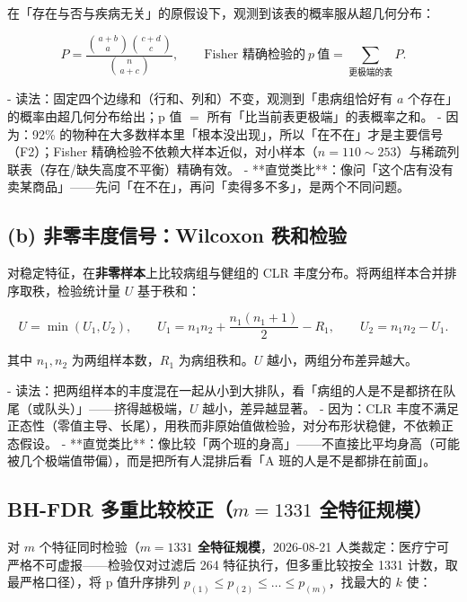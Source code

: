 \documentclass{internal-report}
\begin{document}
在「存在与否与疾病无关」的原假设下，观测到该表的概率服从超几何分布：

\begin{equation}
  P = \frac{\binom{a+b}{a}\binom{c+d}{c}}{\binom{n}{a+c}},
  \qquad
  \text{Fisher 精确检验的}\ p\ \text{值} = \sum_{\text{更极端的表}} P.
  \label{eq:fisher}
\end{equation}

- 读法：固定四个边缘和（行和、列和）不变，观测到「患病组恰好有 $a$ 个存在」的概率由超几何分布给出；p 值 $=$ 所有「比当前表更极端」的表概率之和。
- 因为：92\% 的物种在大多数样本里「根本没出现」，所以「在不在」才是主要信号（F2）；Fisher 精确检验不依赖大样本近似，对小样本（$n=110\sim253$）与稀疏列联表（存在/缺失高度不平衡）精确有效。
- **直觉类比**：像问「这个店有没有卖某商品」——先问「在不在」，再问「卖得多不多」，是两个不同问题。

\subsection{(b) 非零丰度信号：Wilcoxon 秩和检验}
\label{sec:wilcoxon}

对稳定特征，在\textbf{非零样本}上比较病组与健组的 CLR 丰度分布。将两组样本合并排序取秩，检验统计量 $U$ 基于秩和：

\begin{equation}
  U = \min(U_1, U_2),
  \qquad
  U_1 = n_1 n_2 + \frac{n_1(n_1+1)}{2} - R_1,
  \qquad
  U_2 = n_1 n_2 - U_1.
  \label{eq:wilcoxon}
\end{equation}

其中 $n_1,n_2$ 为两组样本数，$R_1$ 为病组秩和。$U$ 越小，两组分布差异越大。

- 读法：把两组样本的丰度混在一起从小到大排队，看「病组的人是不是都挤在队尾（或队头）」——挤得越极端，$U$ 越小，差异越显著。
- 因为：CLR 丰度不满足正态性（零值主导、长尾），用秩而非原始值做检验，对分布形状稳健，不依赖正态假设。
- **直觉类比**：像比较「两个班的身高」——不直接比平均身高（可能被几个极端值带偏），而是把所有人混排后看「A 班的人是不是都排在前面」。

\subsection{BH-FDR 多重比较校正（$m=1331$ 全特征规模）}
\label{sec:fdr}

对 $m$ 个特征同时检验（\textbf{$m=1331$ 全特征规模}，2026-08-21 人类裁定：医疗宁可严格不可虚报——检验仅对过滤后 264 特征执行，但多重比较按全 1331 计数，取最严格口径），将 p 值升序排列 $p_{(1)}\le p_{(2)}\le\dots\le p_{(m)}$，找最大的 $k$ 使：
\end{document}
